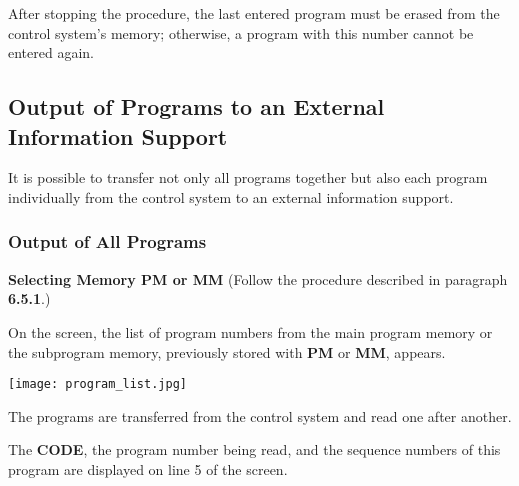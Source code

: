 After stopping the procedure, the last entered program must be erased from the control system's memory; otherwise, a program with this number cannot be entered again.

\newpage

\subsection{Output of Programs to an External Information Support}

It is possible to transfer not only all programs together but also each program individually from the control system to an external information support.

\subsubsection{Output of All Programs}

\textbf{Selecting Memory PM or MM}  
(Follow the procedure described in paragraph \textbf{6.5.1}.)

On the screen, the list of program numbers from the main program memory or the subprogram memory, previously stored with \textbf{PM} or \textbf{MM}, appears.

\begin{center}
    \texttt{[image: program\_list.jpg]}
\end{center}

\begin{itemize}
\end{itemize}

\vspace{.5cm}

\begin{itemize}
\end{itemize}

\vspace{.5cm}

\begin{itemize}
\end{itemize}

The programs are transferred from the control system and read one after another.

The \textbf{CODE}, the program number being read, and the sequence numbers of this program are displayed on line 5 of the screen.

